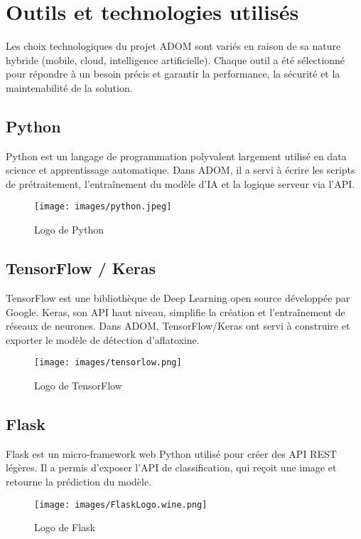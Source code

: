 \documentclass[12pt,a4paper]{report}
\begin{document}
\section{Outils et technologies utilisés}

Les choix technologiques du projet ADOM sont variés en raison de sa nature hybride
(mobile, cloud, intelligence artificielle). Chaque outil a été sélectionné pour répondre à un besoin précis
et garantir la performance, la sécurité et la maintenabilité de la solution.

\subsection{Python}
Python est un langage de programmation polyvalent largement utilisé en data science et
apprentissage automatique. Dans ADOM, il a servi à écrire les scripts de prétraitement,
l’entraînement du modèle d’IA et la logique serveur via l’API.\@
\begin{figure}[H]
    \centering
    \texttt{[image: images/python.jpeg]}
    \caption{Logo de Python}
\end{figure}

\subsection{TensorFlow / Keras}
TensorFlow est une bibliothèque de Deep Learning open source développée par Google.
Keras, son API haut niveau, simplifie la création et l’entraînement de réseaux de neurones.
Dans ADOM, TensorFlow/Keras ont servi à construire et exporter le modèle de détection d’aflatoxine.
\begin{figure}[H]
    \centering
    \texttt{[image: images/tensorlow.png]} %
    \caption{Logo de TensorFlow}
\end{figure}
\cleardoublepage

\subsection{Flask}
Flask est un micro-framework web Python utilisé pour créer des API REST légères.
Il a permis d’exposer l’API de classification, qui reçoit une image et retourne la prédiction
du modèle.
\begin{figure}[H]
    \centering
    \texttt{[image: images/FlaskLogo.wine.png]}
    \caption{Logo de Flask}
\end{figure}
\end{document}
